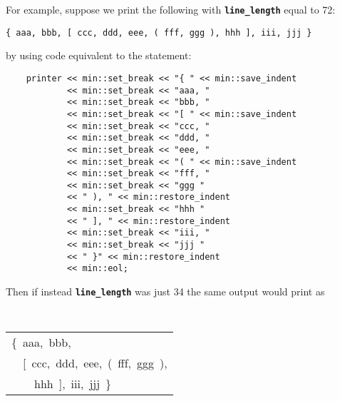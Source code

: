 \documentclass[12pt]{article}
\newcommand{\TT}[1]{{\tt \bfseries #1}}
\newcommand{\EOL}{\penalty \exhyphenpenalty}
\newenvironment{indpar}[1][0.3in]%
	{\begin{list}{}%
		     {\setlength{\itemsep}{0in}%
		      \setlength{\topsep}{0in}%
		      \setlength{\parsep}{1ex}%
		      \setlength{\labelwidth}{#1}%
		      \setlength{\leftmargin}{#1}%
		      \addtolength{\leftmargin}{\labelsep}}%
	 \item}%
	{\end{list}}
\begin{document}
For example, suppose we print the following
with \TT{line\_\EOL length} equal to 72:
\begin{center}
\tt \{~aaa,~bbb,~[~ccc,~ddd,~eee,~(~fff,~ggg~),~hhh~],~iii,~jjj~\}
\end{center}
by using code equivalent to the statement:
\begin{indpar}\begin{verbatim}
    printer << min::set_break << "{ " << min::save_indent
            << min::set_break << "aaa, "
            << min::set_break << "bbb, "
            << min::set_break << "[ " << min::save_indent 
            << min::set_break << "ccc, "
            << min::set_break << "ddd, "
            << min::set_break << "eee, "
            << min::set_break << "( " << min::save_indent 
            << min::set_break << "fff, "
            << min::set_break << "ggg "
            << " ), " << min::restore_indent 
            << min::set_break << "hhh "
            << " ], " << min::restore_indent 
            << min::set_break << "iii, "
            << min::set_break << "jjj "
            << " }" << min::restore_indent 
            << min::eol;
\end{verbatim}\end{indpar}
Then if instead \TT{line\_\EOL length} was just 34 the same output would
print as
\begin{center}
\tt
\begin{tabular}{l}
\{~aaa,~bbb, \\
~~[~ccc,~ddd,~eee,~(~fff,~ggg~), \\
~~~~hhh~],~iii,~jjj~\} \\
\end{tabular}
\end{center}
\end{document}
